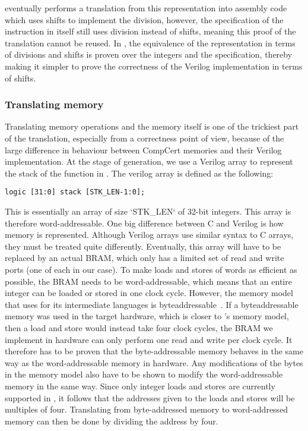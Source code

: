 \compcert{} eventually performs a translation from this representation into
assembly code which uses shifts to implement the division, however, the
specification of the instruction in \rtl{} itself still uses division instead of
shifts, meaning this proof of the translation cannot be reused.  In \vericert{},
the equivalence of the representation in terms of divisions and shifts is proven
over the integers and the specification, thereby making it simpler to prove the
correctness of the Verilog implementation in terms of shifts.

\subsubsection{Translating memory}
\label{sec:hg:translating-memory}

Translating memory operations and the memory itself is one of the trickiest part
of the translation, especially from a correctness point of view, because of the
large difference in behaviour between CompCert memories and their Verilog
implementation.  At the stage of \htl{} generation, we use a Verilog array to
represent the stack of the function in \rtlsubpar{}.  The verilog array is
defined as the following:

\begin{verbatim}
logic [31:0] stack [STK_LEN-1:0];
\end{verbatim}

This is essentially an array of size \veriloginline`STK_LEN` of 32-bit integers.
This array is therefore word-addressable.  One big difference between C and
Verilog is how memory is represented.  Although Verilog arrays use similar
syntax to C arrays, they must be treated quite differently.  Eventually, this
array will have to be replaced by an actual \gls{BRAM}, which only has a limited set of
read and write ports (one of each in our case).  To make loads and stores of
words as efficient as possible, the \gls{BRAM} needs to be word-addressable, which
means that an entire integer can be loaded or stored in one clock cycle.
However, the memory model that \compcert{} uses for its intermediate languages
is byte\?addressable~\cite{blazy05_formal_verif_memor_model_c}.  If a
byte\?addressable memory was used in the target hardware, which is closer to
\compcert{}'s memory model, then a load and store would instead take four clock
cycles, the \gls{BRAM} we implement in hardware can only perform one read and write per
clock cycle.  It therefore has to be proven that the byte-addressable memory
behaves in the same way as the word-addressable memory in hardware.  Any
modifications of the bytes in the \compcert{} memory model also have to be shown
to modify the word-addressable memory in the same way.  Since only integer loads
and stores are currently supported in \vericert{}, it follows that the addresses
given to the loads and stores will be multiples of four.  Translating from
byte-addressed memory to word-addressed memory can then be done by dividing the
address by four.

